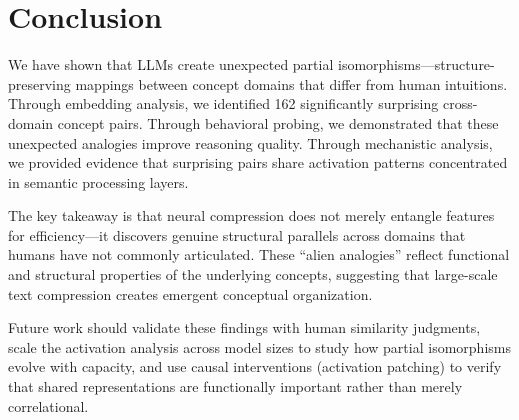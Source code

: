 \section{Conclusion}
\label{sec:conclusion}

We have shown that LLMs create unexpected partial isomorphisms---structure-preserving mappings between concept domains that differ from human intuitions.
Through embedding analysis, we identified 162 significantly surprising cross-domain concept pairs.
Through behavioral probing, we demonstrated that these unexpected analogies improve reasoning quality.
Through mechanistic analysis, we provided evidence that surprising pairs share activation patterns concentrated in semantic processing layers.

The key takeaway is that neural compression does not merely entangle features for efficiency---it discovers genuine structural parallels across domains that humans have not commonly articulated.
These ``alien analogies'' reflect functional and structural properties of the underlying concepts, suggesting that large-scale text compression creates emergent conceptual organization.

Future work should validate these findings with human similarity judgments, scale the activation analysis across model sizes to study how partial isomorphisms evolve with capacity, and use causal interventions (activation patching) to verify that shared representations are functionally important rather than merely correlational.
